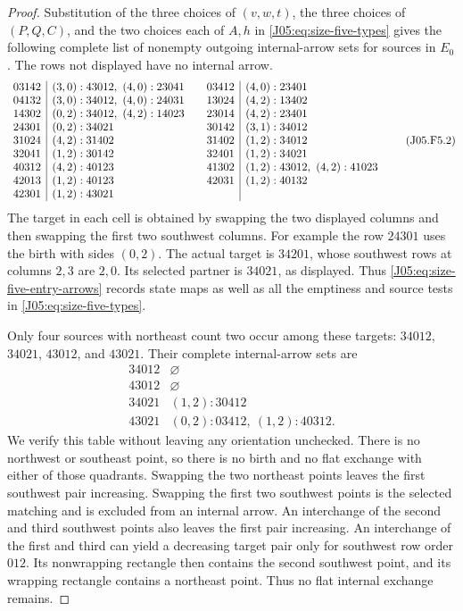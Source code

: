 \documentclass[11pt,oneside]{report}
\theoremstyle{definition}
\numberwithin{equation}{section}
\begin{document}
\begin{proof}
Substitution of the three choices of $(v,w,t)$, the three choices of
$(P,Q,C)$, and the two choices each of $A,h$ in
\eqref{J05:eq:size-five-types} gives the following complete list of
nonempty outgoing internal-arrow sets for sources in $E_0$.
The rows not displayed have no internal arrow.
\[
\begin{array}{c|l@{\qquad}c|l}
03142&(3,0):43012,\ (4,0):23041&03412&(4,0):23401\\
04132&(3,0):34012,\ (4,0):24031&13024&(4,2):13402\\
14302&(0,2):34012,\ (4,2):14023&23014&(4,2):23401\\
24301&(0,2):34021&30142&(3,1):34012\\
31024&(4,2):31402&31402&(1,2):34012\\
32041&(1,2):30142&32401&(1,2):34021\\
40312&(4,2):40123&41302&(1,2):43012,\ (4,2):41023\\
42013&(1,2):40123&42031&(1,2):40132\\
42301&(1,2):43021&&
\end{array}
\tag{J05.F5.2}\label{J05:eq:size-five-entry-arrows}
\]
The target in each cell is obtained by swapping the two displayed
columns and then swapping the first two southwest columns.
For example the row $24301$ uses the birth with sides $(0,2)$.
The actual target is $34201$, whose southwest rows at columns $2,3$
are $2,0$. Its selected partner is $34021$, as displayed.
Thus \eqref{J05:eq:size-five-entry-arrows} records state maps as well as
all the emptiness and source tests in \eqref{J05:eq:size-five-types}.

Only four sources with northeast count two occur among these targets:
$34012$, $34021$, $43012$, and $43021$.
Their complete internal-arrow sets are
\[
\begin{array}{c|l}
34012&\varnothing\\
43012&\varnothing\\
34021&(1,2):30412\\
43021&(0,2):03412,\ (1,2):40312.
\end{array}
\tag{J05.F5.3}\label{J05:eq:size-five-high-arrows}
\]
We verify this table without leaving any orientation unchecked.
There is no northwest or southeast point, so there is no birth and
no flat exchange with either of those quadrants.
Swapping the two northeast points leaves the first southwest pair
increasing. Swapping the first two southwest points is the selected
matching and is excluded from an internal arrow.
An interchange of the second and third southwest points also leaves
the first pair increasing. An interchange of the first and third
can yield a decreasing target pair only for southwest row order
$012$. Its nonwrapping rectangle then contains the second southwest
point, and its wrapping rectangle contains a northeast point.
Thus no flat internal exchange remains.


\end{proof}
\end{document}
